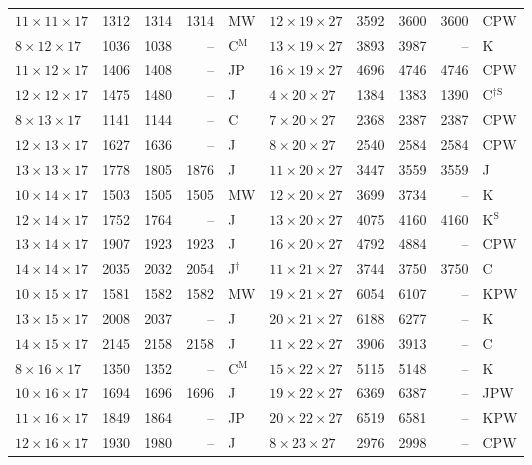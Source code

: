 \begin{longtable}{@{}lrrrl@{\hspace{6mm}}lrrrl@{}}
$11{\times}11{\times}17$ & 1312 & 1314 & 1314 & MW & $12{\times}19{\times}27$ & 3592 & 3600 & 3600 & CPW\\
$8{\times}12{\times}17$ & 1036 & 1038 & -- & C$^{\mathrm{M}}$ & $13{\times}19{\times}27$ & 3893 & 3987 & -- & K\\
$11{\times}12{\times}17$ & 1406 & 1408 & -- & JP & $16{\times}19{\times}27$ & 4696 & 4746 & 4746 & CPW\\
$12{\times}12{\times}17$ & 1475 & 1480 & -- & J & $4{\times}20{\times}27$ & 1384 & 1383 & 1390 & C$^{\dagger\mathrm{S}}$\\
$8{\times}13{\times}17$ & 1141 & 1144 & -- & C & $7{\times}20{\times}27$ & 2368 & 2387 & 2387 & CPW\\
$12{\times}13{\times}17$ & 1627 & 1636 & -- & J & $8{\times}20{\times}27$ & 2540 & 2584 & 2584 & CPW\\
$13{\times}13{\times}17$ & 1778 & 1805 & 1876 & J & $11{\times}20{\times}27$ & 3447 & 3559 & 3559 & J\\
$10{\times}14{\times}17$ & 1503 & 1505 & 1505 & MW & $12{\times}20{\times}27$ & 3699 & 3734 & -- & K\\
$12{\times}14{\times}17$ & 1752 & 1764 & -- & J & $13{\times}20{\times}27$ & 4075 & 4160 & 4160 & K$^{\mathrm{S}}$\\
$13{\times}14{\times}17$ & 1907 & 1923 & 1923 & J & $16{\times}20{\times}27$ & 4792 & 4884 & -- & CPW\\
$14{\times}14{\times}17$ & 2035 & 2032 & 2054 & J$^{\dagger}$ & $11{\times}21{\times}27$ & 3744 & 3750 & 3750 & C\\
$10{\times}15{\times}17$ & 1581 & 1582 & 1582 & MW & $19{\times}21{\times}27$ & 6054 & 6107 & -- & KPW\\
$13{\times}15{\times}17$ & 2008 & 2037 & -- & J & $20{\times}21{\times}27$ & 6188 & 6277 & -- & K\\
$14{\times}15{\times}17$ & 2145 & 2158 & 2158 & J & $11{\times}22{\times}27$ & 3906 & 3913 & -- & C\\
$8{\times}16{\times}17$ & 1350 & 1352 & -- & C$^{\mathrm{M}}$ & $15{\times}22{\times}27$ & 5115 & 5148 & -- & K\\
$10{\times}16{\times}17$ & 1694 & 1696 & 1696 & J & $19{\times}22{\times}27$ & 6369 & 6387 & -- & JPW\\
$11{\times}16{\times}17$ & 1849 & 1864 & -- & JP & $20{\times}22{\times}27$ & 6519 & 6581 & -- & KPW\\
$12{\times}16{\times}17$ & 1930 & 1980 & -- & J & $8{\times}23{\times}27$ & 2976 & 2998 & -- & CPW\\

\end{longtable}
